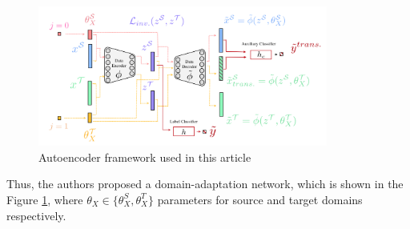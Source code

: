\begin{figure}[H]
    \centering
    \includegraphics[width=0.85\textwidth]{Figures/From articles/DA_cnn.png}
    \caption{Autoencoder framework used in this article}
    \label{fig: DA_cnn}
\end{figure}

Thus, the authors proposed a domain-adaptation network, which is shown in the Figure \ref{fig: DA_cnn}, where $\theta_X \in \{\theta_X^S, \theta_X^T\}$ parameters for source and target domains respectively. 